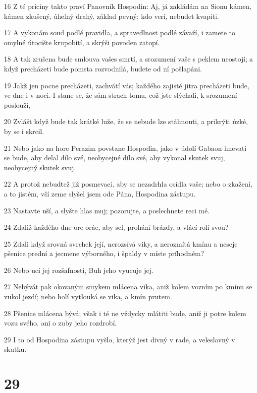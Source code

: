 \par 16 Z té príciny takto praví Panovník Hospodin: Aj, já zakládám na Sionu kámen, kámen zkušený, úhelný drahý, základ pevný; kdo verí, nebudet kvapiti.
\par 17 A vykonám soud podlé pravidla, a spravedlnost podlé závaží, i zamete to omylné útocište krupobití, a skrýši povoden zatopí.
\par 18 A tak zrušena bude smlouva vašes smrtí, a srozumení vaše s peklem neostojí; a když precházeti bude pomsta rozvodnilá, budete od ní pošlapáni.
\par 19 Jakž jen pocne precházeti, zachvátí vás; každého zajisté jitra precházeti bude, ve dne i v noci. I stane se, že sám strach tomu, což jste slýchali, k srozumení poslouží,
\par 20 Zvlášt když bude tak krátké luže, že se nebude lze stáhnouti, a prikrýti úzké, by se i skrcil.
\par 21 Nebo jako na hore Perazim povstane Hospodin, jako v údolí Gabaon hnevati se bude, aby delal dílo své, neobycejné dílo své, aby vykonal skutek svuj, neobycejný skutek svuj.
\par 22 A protož nebudtež již posmevaci, aby se nezadrhla osídla vaše; nebo o zkažení, a to jistém, vší zeme slyšel jsem ode Pána, Hospodina zástupu.
\par 23 Nastavte uší, a slyšte hlas muj; pozorujte, a poslechnete reci mé.
\par 24 Zdaliž každého dne ore orác, aby sel, prohání brázdy, a vlácí rolí svou?
\par 25 Zdali když srovná svrchek její, nerozsívá viky, a nerozmítá kmínu a neseje pšenice prední a jecmene výborného, i špaldy v míste príhodném?
\par 26 Nebo ucí jej rozšafnosti, Buh jeho vyucuje jej.
\par 27 Nebývát pak okovaným smykem mlácena vika, aniž kolem vozním po kmínu se vukol jezdí; nebo holí vytlouká se vika, a kmín prutem.
\par 28 Pšenice mlácena bývá; však i té ne vždycky mlátiti bude, aniž ji potre kolem vozu svého, ani o zuby jeho rozdrobí.
\par 29 I to od Hospodina zástupu vyšlo, kterýž jest divný v rade, a veleslavný v skutku.

\chapter{29}

